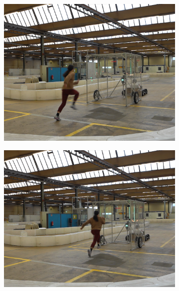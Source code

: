 \documentclass[a4paper,12pt,oneside]{book}
\begin{document}
\begin{figure}[h!]
\begin{subfigure}[b]{0.24\textwidth}
    \end{subfigure}
    \hfill
    \begin{subfigure}[b]{0.24\textwidth}
        \includegraphics[width=\textwidth]{Catch/Catch3.png}
    \end{subfigure}
    \hfill
    \begin{subfigure}[b]{0.24\textwidth}
        \includegraphics[width=\textwidth]{Catch/Catch4.png}
    \end{subfigure}
\\[0.2cm]
    \begin{subfigure}[b]{0.24\textwidth}

\end{subfigure}
\end{figure}
\end{document}
